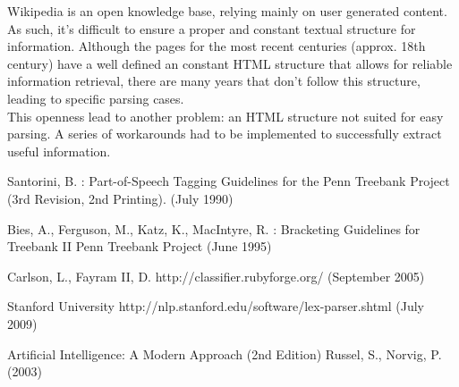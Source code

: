 \documentclass{llncs}
\begin{document}
Wikipedia is an open knowledge base, relying mainly on user generated content. As such, it's difficult to ensure a proper and constant textual structure for information. Although the pages for the most recent centuries (approx. 18th century) have a well defined an constant HTML structure that allows for reliable information retrieval, there are many years that don't follow this structure, leading to specific parsing cases.\\

This openness lead to another problem: an HTML structure not suited for easy parsing. A series of workarounds had to be implemented to successfully extract useful information.

%
%
\begin{thebibliography}{}
%
Santorini, B. :
Part-of-Speech Tagging Guidelines for the
Penn Treebank Project (3rd Revision, 2nd Printing).
(July 1990)

Bies, A., Ferguson, M., Katz, K., MacIntyre, R. :
Bracketing Guidelines for Treebank II
Penn Treebank Project
(June 1995)

Carlson, L., Fayram II, D.
http://classifier.rubyforge.org/
(September 2005)

Stanford University
http://nlp.stanford.edu/software/lex-parser.shtml
(July 2009)

Artificial Intelligence: A Modern Approach (2nd Edition)
Russel, S., Norvig, P.
(2003)

\end{thebibliography}
\end{document}
